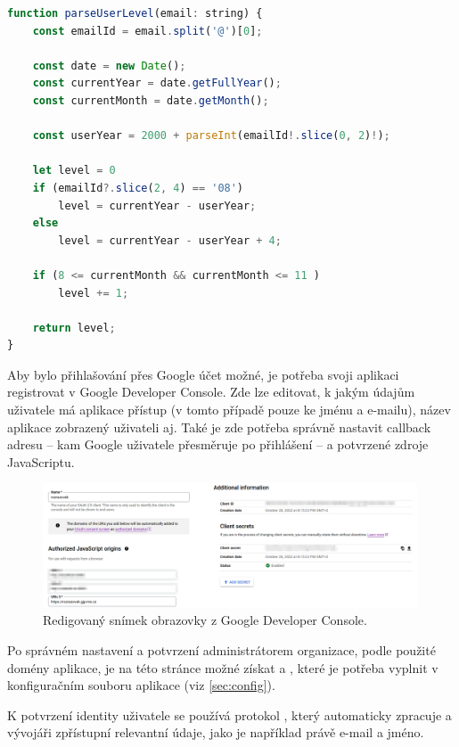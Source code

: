 \begin{lstlisting}[language=JavaScript,caption={Zjištění aktuálního ročníku uživatele}]
function parseUserLevel(email: string) {
    const emailId = email.split('@')[0];
    
    const date = new Date();
    const currentYear = date.getFullYear();
    const currentMonth = date.getMonth();
    
    const userYear = 2000 + parseInt(emailId!.slice(0, 2)!);
    
    let level = 0
    if (emailId?.slice(2, 4) == '08')
        level = currentYear - userYear;
    else
        level = currentYear - userYear + 4;
    
    if (8 <= currentMonth && currentMonth <= 11 )
        level += 1;
    
    return level;
}
\end{lstlisting}

Aby bylo přihlašování přes Google účet možné, je potřeba svoji aplikaci registrovat v Google Developer Console. Zde lze editovat, k jakým údajům uživatele má aplikace přístup (v tomto případě pouze ke jménu a e-mailu), název aplikace zobrazený uživateli aj. Také je zde potřeba správně nastavit callback adresu -- kam Google uživatele přesměruje po přihlášení -- a potvrzené zdroje JavaScriptu.

\begin{figure}[H]
    \centering
    \includegraphics[width=420px]{images/02technologie/google-console.png}
    \caption{Redigovaný snímek obrazovky z Google Developer Console.}
\end{figure}

Po správném nastavení a potvrzení administrátorem organizace, podle použité domény aplikace, je na této stránce možné získat  a , které je potřeba vyplnit v konfiguračním souboru aplikace (viz \ref{sec:config}).

K potvrzení identity uživatele se používá protokol , který  automaticky zpracuje a vývojáři zpřístupní relevantní údaje, jako je například právě e-mail a jméno.

